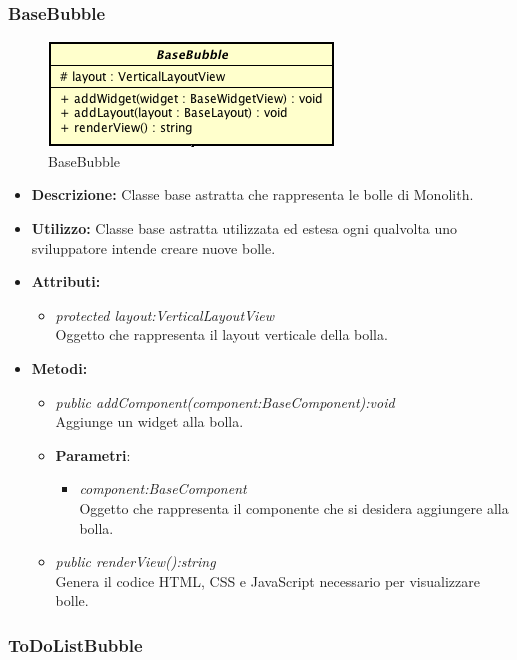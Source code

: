 \subsubsection{BaseBubble}

\label{BaseBubble}
\begin{figure}[ht]
	\centering
	\includegraphics[scale=0.5]{Sezioni/SottosezioniST/img/BaseBubble.png}
	\caption{BaseBubble}
\end{figure}

\begin{itemize}
\item \textbf{Descrizione:} Classe base astratta che rappresenta le bolle di Monolith.
\item \textbf{Utilizzo:} Classe base astratta utilizzata ed estesa ogni qualvolta uno sviluppatore intende creare nuove bolle.
\item \textbf{Attributi:} 
\begin{itemize}
\item \textit{protected layout:VerticalLayoutView}\\
Oggetto che rappresenta il layout verticale della bolla.
\end{itemize}
\item \textbf{Metodi:}
\begin{itemize}
\item \textit{public addComponent(component:BaseComponent):void}\\
Aggiunge un widget alla bolla.
\item{\textbf{Parametri}: \begin{itemize}
\item \textit{component:BaseComponent}\\
Oggetto che rappresenta il componente che si desidera aggiungere alla bolla.
\end{itemize}}
\item \textit{public renderView():string}\\
Genera il codice HTML, CSS e JavaScript necessario per visualizzare bolle.
\end{itemize}
\end{itemize}

\subsubsection{ToDoListBubble}

